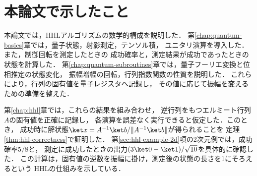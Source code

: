 \section{本論文で示したこと}
\label{sec:conclusion-results}

本論文では，HHLアルゴリズムの数学的構成を説明した．
第\ref{chap:quantum-basics}章では，量子状態，射影測定，テンソル積，
ユニタリ演算を導入した．また，制御回転を測定したときの
成功確率と，測定結果が成功であったときの状態を計算した．
第\ref{chap:quantum-subroutines}章では，量子フーリエ変換と位相推定の状態変化，
振幅増幅の回転，行列指数関数の性質を説明した．
これらにより，行列の固有値を量子レジスタへ記録し，
その値に応じて振幅を変えるための準備を整えた．

第\ref{chap:hhl}章では，これらの結果を組み合わせ，
逆行列をもつエルミート行列$A$の固有値を正確に記録し，
各演算を誤差なく実行できると仮定した．このとき，
成功時に解状態$\ket x=A^{-1}\ket b/\lVert A^{-1}\ket b\rVert$が得られることを
定理\ref{thm:hhl-correctness}で証明した．
第\ref{sec:hhl-example-2d}項の2次元例では，成功確率$5/8$と，
測定に成功したときの出力$(3\ket0-\ket1)/\sqrt{10}$を具体的に確認した．
この計算は，固有値の逆数を振幅に掛け，測定後の状態の長さを1にそろえるという
HHLの仕組みを示している．
